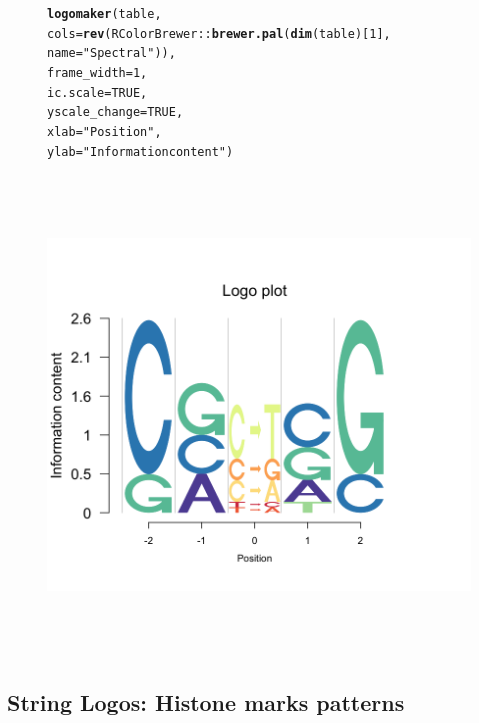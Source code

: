 \documentclass[12pt]{article}\usepackage[]{graphicx}\usepackage[usenames,dvipsnames]{color}
\makeatletter
\newcommand{\hlnum}[1]{\textcolor[rgb]{0.686,0.059,0.569}{#1}}%
\newcommand{\hlstr}[1]{\textcolor[rgb]{0.192,0.494,0.8}{#1}}%
\newcommand{\hlopt}[1]{\textcolor[rgb]{0,0,0}{#1}}%
\newcommand{\hlstd}[1]{\textcolor[rgb]{0.345,0.345,0.345}{#1}}%
\newcommand{\hlkwc}[1]{\textcolor[rgb]{0.333,0.667,0.333}{#1}}%
\newcommand{\hlkwd}[1]{\textcolor[rgb]{0.737,0.353,0.396}{\textbf{#1}}}%
\newenvironment{kframe}{%
 \def\at@end@of@kframe{}%
 \ifinner\ifhmode%
  \def\at@end@of@kframe{\end{minipage}}%
  \begin{minipage}{\columnwidth}%
 \fi\fi%
 \def\FrameCommand##1{\hskip\@totalleftmargin \hskip-\fboxsep
 \colorbox{shadecolor}{##1}\hskip-\fboxsep
     \hskip-\linewidth \hskip-\@totalleftmargin \hskip\columnwidth}%
 \MakeFramed {\advance\hsize-\width
   \@totalleftmargin\z@ \linewidth\hsize
   \@setminipage}}%
 {\par\unskip\endMakeFramed%
 \at@end@of@kframe}
\newenvironment{knitrout}{}{} %
\makeatother
\begin{document}
\begin{figure}[htp]
\begin{center}
\begin{knitrout}
\color{fgcolor}\begin{kframe}
\begin{alltt}
\hlkwd{logomaker}\hlstd{(table,}
          \hlkwc{cols}\hlstd{=} \hlkwd{rev}\hlstd{(RColorBrewer}\hlopt{::}\hlkwd{brewer.pal}\hlstd{(}\hlkwd{dim}\hlstd{(table)[}\hlnum{1}\hlstd{],}
          \hlkwc{name} \hlstd{=} \hlstr{"Spectral"}\hlstd{)),}
          \hlkwc{frame_width} \hlstd{=} \hlnum{1}\hlstd{,}
          \hlkwc{ic.scale} \hlstd{=} \hlnum{TRUE}\hlstd{,}
          \hlkwc{yscale_change}\hlstd{=}\hlnum{TRUE}\hlstd{,}
          \hlkwc{xlab} \hlstd{=} \hlstr{"Position"}\hlstd{,}
          \hlkwc{ylab} \hlstd{=} \hlstr{"Information content"}\hlstd{)}
\end{alltt}
\end{kframe}
\includegraphics[width=6in,height=5in]{figure/logolas_use_7-1} 

\end{knitrout}
\end{center}
\end{figure}


\newpage

\subsection{String Logos:  Histone marks patterns}
\end{document}
